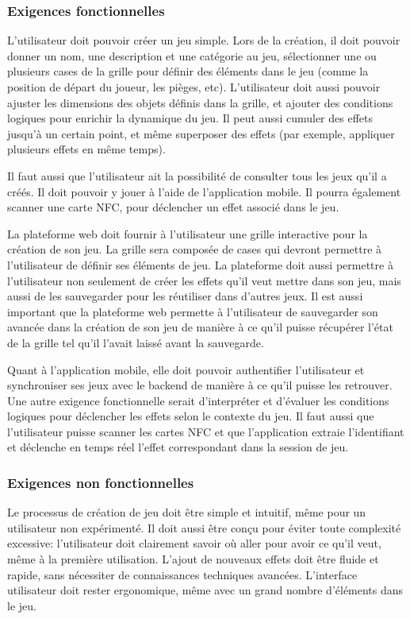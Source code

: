 \documentclass[12pt]{article}        %
\begin{document}
\subsubsection{Exigences fonctionnelles}
\label{subsubsec:fonctionnelles}  
L'utilisateur doit pouvoir créer un jeu simple. Lors de la création,
il doit pouvoir donner un nom, une description et une catégorie au jeu,
sélectionner une ou plusieurs cases de la grille pour définir des éléments
dans le jeu (comme la position de départ du joueur, les pièges, etc).
L'utilisateur doit aussi pouvoir ajuster les dimensions des objets définis 
dans la grille, et ajouter des conditions logiques pour enrichir la 
dynamique du jeu. Il peut aussi cumuler des effets jusqu'à un certain 
point, et même superposer des effets (par exemple, appliquer plusieurs 
effets en même temps).

Il faut aussi que l'utilisateur ait la possibilité de consulter tous 
les jeux qu'il a créés. Il doit pouvoir y jouer à l'aide
de l'application mobile. Il pourra également scanner une carte NFC,
pour déclencher un effet associé dans le jeu.

La plateforme web doit fournir à l'utilisateur une grille interactive
pour la création de son jeu. La grille sera composée de cases qui 
devront permettre à l'utilisateur de définir ses éléments de jeu.
La plateforme doit aussi permettre à l'utilisateur non seulement de créer 
les effets qu'il veut mettre dans son jeu, mais aussi de les sauvegarder
pour les réutiliser dans d'autres jeux. Il est aussi important que la 
plateforme web permette à l'utilisateur de sauvegarder son avancée dans 
la création de son jeu de manière à ce qu'il puisse récupérer l'état de 
la grille tel qu'il l'avait laissé avant la sauvegarde.

Quant à l'application mobile, elle doit pouvoir authentifier l'utilisateur
et synchroniser ses jeux avec le backend de manière à ce qu'il puisse les
retrouver. Une autre exigence fonctionnelle serait d'interpréter et 
d'évaluer les conditions logiques pour déclencher les effets selon le 
contexte du jeu. Il faut aussi que l'utilisateur puisse scanner les 
cartes NFC et que l'application extraie l'identifiant et déclenche en 
temps réel l'effet correspondant dans la session de jeu.

\subsubsection{Exigences non fonctionnelles}
\label{subsubsec:non fonctionnelles}  
Le processus de création de jeu doit être simple et intuitif, même
pour un utilisateur non expérimenté. Il doit aussi être conçu pour 
éviter toute complexité excessive: l'utilisateur doit clairement
savoir où aller pour avoir ce qu'il veut, même à la première utilisation.
L'ajout de nouveaux effets doit être fluide et rapide, sans nécessiter de
connaissances techniques avancées. L'interface utilisateur doit rester
ergonomique, même avec un grand nombre d'éléments dans le jeu.
\end{document}
